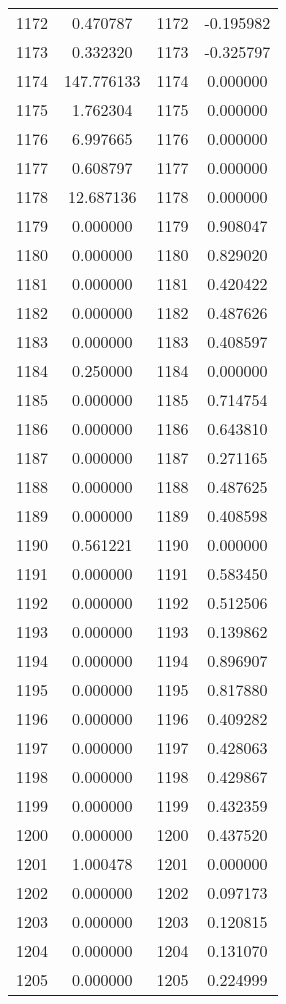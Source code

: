 \documentclass[12pt]{article}
\begin{document}
\begin{longtable}{@{}cccc@{}}
1172 & 0.470787 & 1172 & -0.195982 \\
1173 & 0.332320 & 1173 & -0.325797 \\
1174 & 147.776133 & 1174 & 0.000000 \\
1175 & 1.762304 & 1175 & 0.000000 \\
1176 & 6.997665 & 1176 & 0.000000 \\
1177 & 0.608797 & 1177 & 0.000000 \\
1178 & 12.687136 & 1178 & 0.000000 \\
1179 & 0.000000 & 1179 & 0.908047 \\
1180 & 0.000000 & 1180 & 0.829020 \\
1181 & 0.000000 & 1181 & 0.420422 \\
1182 & 0.000000 & 1182 & 0.487626 \\
1183 & 0.000000 & 1183 & 0.408597 \\
1184 & 0.250000 & 1184 & 0.000000 \\
1185 & 0.000000 & 1185 & 0.714754 \\
1186 & 0.000000 & 1186 & 0.643810 \\
1187 & 0.000000 & 1187 & 0.271165 \\
1188 & 0.000000 & 1188 & 0.487625 \\
1189 & 0.000000 & 1189 & 0.408598 \\
1190 & 0.561221 & 1190 & 0.000000 \\
1191 & 0.000000 & 1191 & 0.583450 \\
1192 & 0.000000 & 1192 & 0.512506 \\
1193 & 0.000000 & 1193 & 0.139862 \\
1194 & 0.000000 & 1194 & 0.896907 \\
1195 & 0.000000 & 1195 & 0.817880 \\
1196 & 0.000000 & 1196 & 0.409282 \\
1197 & 0.000000 & 1197 & 0.428063 \\
1198 & 0.000000 & 1198 & 0.429867 \\
1199 & 0.000000 & 1199 & 0.432359 \\
1200 & 0.000000 & 1200 & 0.437520 \\
1201 & 1.000478 & 1201 & 0.000000 \\
1202 & 0.000000 & 1202 & 0.097173 \\
1203 & 0.000000 & 1203 & 0.120815 \\
1204 & 0.000000 & 1204 & 0.131070 \\
1205 & 0.000000 & 1205 & 0.224999 \\

\end{longtable}
\end{document}
